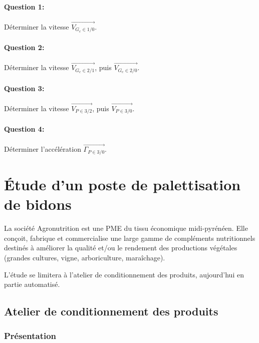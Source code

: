 \paragraph{Question 1:}

Déterminer la vitesse $\overrightarrow{V_{G_c \in 1/0}}$.

\paragraph{Question 2:}

Déterminer la vitesse $\overrightarrow{V_{G_c \in 2/1}}$, puis $\overrightarrow{V_{G_c \in 2/0}}$.

\paragraph{Question 3:}

Déterminer la vitesse $\overrightarrow{V_{P \in 3/2}}$, puis $\overrightarrow{V_{P \in 3/0}}$.

\paragraph{Question 4:}

Déterminer l'accélération $\overrightarrow{\Gamma_{P \in 3/0}}$.

\newpage

\section{Étude d'un poste de palettisation de bidons}

La société Agronutrition est une PME du tissu économique midi-pyrénéen. Elle conçoit, fabrique et commercialise une large gamme de compléments nutritionnels destinés à améliorer la qualité et/ou le rendement des productions végétales (grandes cultures, vigne, arboriculture, maraîchage).

L'étude se limitera à l'atelier de conditionnement des produits, aujourd'hui en partie automatisé.

\subsection{Atelier de conditionnement des produits}

\subsubsection{Présentation}

